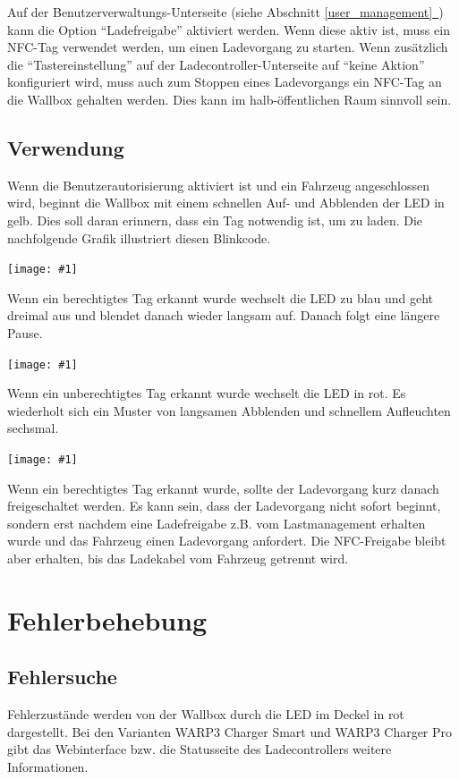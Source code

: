 \documentclass[a4paper,10pt]{article}
\newcommand{\gfx}[1]{\texttt{[image: \#1]}}
\newcommand*{\fullref}[1]{Abschnitt \hyperref[{#1}]{\ref*{#1}~\nameref*{#1}}}
\begin{document}
\begin{multicols*}{2}
    Auf der Benutzerverwaltungs-Unterseite (siehe \fullref{user_management}) kann die Option \enquote{Ladefreigabe} aktiviert werden.
    Wenn diese aktiv ist, muss ein NFC-Tag verwendet werden, um einen Ladevorgang zu starten.
    Wenn zusätzlich die \enquote{Tastereinstellung} auf der Ladecontroller-Unterseite auf \enquote{keine Aktion} konfiguriert wird,
    muss auch zum Stoppen eines Ladevorgangs ein NFC-Tag an die Wallbox gehalten werden. Dies kann im
    halb-öffentlichen Raum sinnvoll sein.

    \subsection{Verwendung}
    Wenn die Benutzerautorisierung aktiviert ist und ein Fahrzeug angeschlossen wird,
    beginnt die Wallbox mit einem schnellen Auf- und Abblenden der LED in gelb.
    Dies soll daran erinnern, dass ein Tag notwendig ist, um zu laden. Die
    nachfolgende Grafik illustriert diesen Blinkcode.

    \gfx{./img_warp3/resized/blink_nag}

    Wenn ein berechtigtes Tag erkannt wurde wechselt die LED zu blau und geht
    dreimal aus und blendet danach wieder langsam auf. Danach folgt eine längere Pause.

    \gfx{./img_warp3/resized/blink_ack}

    Wenn ein unberechtigtes Tag erkannt wurde wechselt die LED in rot. Es wiederholt sich ein Muster von langsamen Abblenden
    und schnellem Aufleuchten sechsmal.

    \gfx{./img_warp3/resized/blink_nack}

    Wenn ein berechtigtes Tag erkannt wurde, sollte der Ladevorgang kurz danach
    freigeschaltet werden. Es kann sein, dass der Ladevorgang nicht
    sofort beginnt, sondern erst nachdem eine Ladefreigabe z.B. vom Lastmanagement erhalten wurde
    und das Fahrzeug einen Ladevorgang anfordert. Die NFC-Freigabe bleibt aber erhalten,
    bis das Ladekabel vom Fahrzeug getrennt wird.

    \newpage \section{Fehlerbehebung}\label{fehlerbehebung} \subsection{Fehlersuche}
    Fehlerzustände werden von der Wallbox durch die LED im Deckel in rot
    dargestellt. Bei den Varianten WARP3 Charger Smart und WARP3 Charger Pro
    gibt das Webinterface bzw. die Statusseite des Ladecontrollers
    weitere Informationen.


\end{multicols*}
\end{document}
